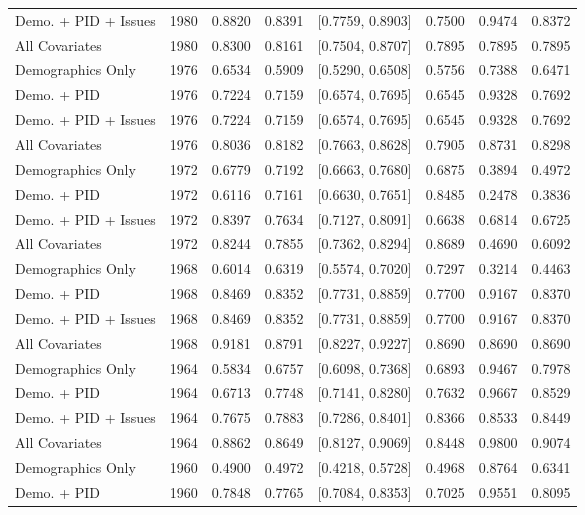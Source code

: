 \begin{longtable}{lrrrlrrr}
  Demo. + PID + Issues & 1980 & 0.8820 & 0.8391 & [0.7759, 0.8903] & 0.7500 & 0.9474 & 0.8372 \\ 
  All Covariates & 1980 & 0.8300 & 0.8161 & [0.7504, 0.8707] & 0.7895 & 0.7895 & 0.7895 \\ 
  Demographics Only & 1976 & 0.6534 & 0.5909 & [0.5290, 0.6508] & 0.5756 & 0.7388 & 0.6471 \\ 
  Demo. + PID & 1976 & 0.7224 & 0.7159 & [0.6574, 0.7695] & 0.6545 & 0.9328 & 0.7692 \\ 
  Demo. + PID + Issues & 1976 & 0.7224 & 0.7159 & [0.6574, 0.7695] & 0.6545 & 0.9328 & 0.7692 \\ 
  All Covariates & 1976 & 0.8036 & 0.8182 & [0.7663, 0.8628] & 0.7905 & 0.8731 & 0.8298 \\ 
  Demographics Only & 1972 & 0.6779 & 0.7192 & [0.6663, 0.7680] & 0.6875 & 0.3894 & 0.4972 \\ 
  Demo. + PID & 1972 & 0.6116 & 0.7161 & [0.6630, 0.7651] & 0.8485 & 0.2478 & 0.3836 \\ 
  Demo. + PID + Issues & 1972 & 0.8397 & 0.7634 & [0.7127, 0.8091] & 0.6638 & 0.6814 & 0.6725 \\ 
  All Covariates & 1972 & 0.8244 & 0.7855 & [0.7362, 0.8294] & 0.8689 & 0.4690 & 0.6092 \\ 
  Demographics Only & 1968 & 0.6014 & 0.6319 & [0.5574, 0.7020] & 0.7297 & 0.3214 & 0.4463 \\ 
  Demo. + PID & 1968 & 0.8469 & 0.8352 & [0.7731, 0.8859] & 0.7700 & 0.9167 & 0.8370 \\ 
  Demo. + PID + Issues & 1968 & 0.8469 & 0.8352 & [0.7731, 0.8859] & 0.7700 & 0.9167 & 0.8370 \\ 
  All Covariates & 1968 & 0.9181 & 0.8791 & [0.8227, 0.9227] & 0.8690 & 0.8690 & 0.8690 \\ 
  Demographics Only & 1964 & 0.5834 & 0.6757 & [0.6098, 0.7368] & 0.6893 & 0.9467 & 0.7978 \\ 
  Demo. + PID & 1964 & 0.6713 & 0.7748 & [0.7141, 0.8280] & 0.7632 & 0.9667 & 0.8529 \\ 
  Demo. + PID + Issues & 1964 & 0.7675 & 0.7883 & [0.7286, 0.8401] & 0.8366 & 0.8533 & 0.8449 \\ 
  All Covariates & 1964 & 0.8862 & 0.8649 & [0.8127, 0.9069] & 0.8448 & 0.9800 & 0.9074 \\ 
  Demographics Only & 1960 & 0.4900 & 0.4972 & [0.4218, 0.5728] & 0.4968 & 0.8764 & 0.6341 \\ 
  Demo. + PID & 1960 & 0.7848 & 0.7765 & [0.7084, 0.8353] & 0.7025 & 0.9551 & 0.8095 \\ 

\end{longtable}
